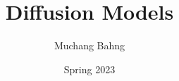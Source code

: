 \documentclass{article}
\begin{document}

\title{Diffusion Models}
\author{Muchang Bahng}
\date{Spring 2023}

\maketitle
\tableofcontents
\pagebreak 






\end{document}
